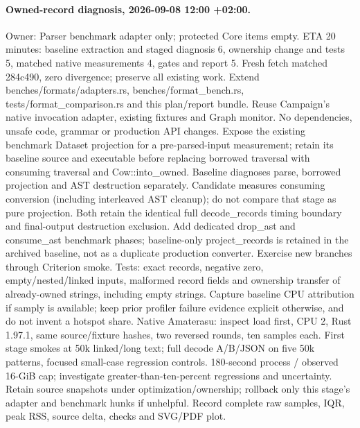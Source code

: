 \documentclass[11pt,a4paper]{article}
\begin{document}
\paragraph{Owned-record diagnosis, 2026-09-08 12:00 +02:00.}
Owner: Parser benchmark adapter only; protected Core items empty. ETA 20 minutes:
baseline extraction and staged diagnosis 6, ownership change and tests 5,
matched native measurements 4, gates and report 5. Fresh fetch matched 284c490,
zero divergence; preserve all existing work. Extend benches/formats/adapters.rs,
benches/format\_bench.rs, tests/format\_comparison.rs and this plan/report bundle.
Reuse Campaign's native invocation adapter, existing fixtures and Graph monitor.
No dependencies, unsafe code, grammar or production API changes. Expose the
existing benchmark Dataset projection for a pre-parsed-input measurement; retain
its baseline source and executable before replacing borrowed traversal with
consuming traversal and Cow::into\_owned. Baseline diagnoses parse, borrowed
projection and AST destruction separately. Candidate measures consuming conversion
(including interleaved AST cleanup); do not compare that stage as pure projection.
Both retain the identical full decode\_records timing boundary and final-output
destruction exclusion. Add dedicated drop\_ast and consume\_ast benchmark phases;
baseline-only project\_records is retained in the archived baseline, not as a
duplicate production converter. Exercise new branches through Criterion smoke.
Tests: exact records, negative zero, empty/nested/linked inputs, malformed record
fields and ownership transfer of already-owned strings, including empty strings.
Capture baseline CPU attribution if samply is available; keep prior profiler
failure evidence explicit otherwise, and do not invent a hotspot share.
Native Amaterasu: inspect load first, CPU 2, Rust 1.97.1, same source/fixture hashes,
two reversed rounds, ten samples each. First stage smokes at 50k linked/long text;
full decode A/B/JSON on five 50k patterns, focused small-case regression controls.
180-second process / observed 16-GiB cap; investigate greater-than-ten-percent
regressions and uncertainty. Retain source snapshots under optimization/ownership;
rollback only this stage's adapter and benchmark hunks if unhelpful. Record
complete raw samples, IQR, peak RSS, source delta, checks and SVG/PDF plot.
\end{document}
